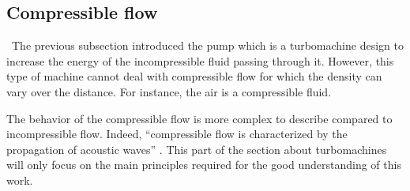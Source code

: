 


\subsection{Compressible flow}
\quad\ The previous subsection introduced the pump which is a turbomachine design to increase the energy of the incompressible fluid passing through it. However, this type of machine cannot deal with compressible flow for which the density can vary over the distance. For instance, the air is a compressible fluid.

The behavior of the compressible flow is more complex to describe compared to incompressible flow. Indeed, “compressible flow is characterized by the propagation of acoustic waves” \cite{Hillewaert2019}.   This part of the section about turbomachines will only focus on the main principles required for the good understanding of this work.


